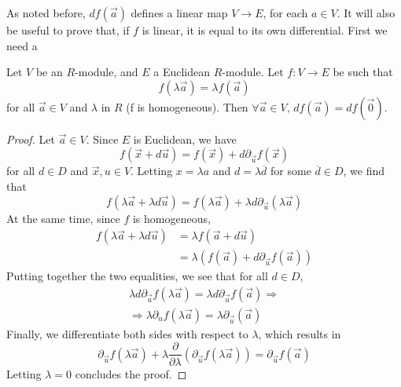 As noted before, \( df(\vec a) \) defines a linear map \( V\to E \), for each \( a\in V \). It will also be useful to prove that, if \( f \) is linear, it is equal to its own differential. First we need a

\begin{lemma}
  Let \( V \) be an \( R \)-module, and \( E \) a Euclidean \( R \)-module. Let \( f:V\to E \) be such that
  \begin{equation*}
    f(\lambda \vec a) = \lambda f(\vec a)
  \end{equation*}
  for all \( \vec a\in V \) and \( \lambda \) in \( R \) (f is homogeneous). Then \( \forall \vec a\in V,\, df(\vec a) = df(\vec 0) \).
  \label{lm:homg}
\end{lemma}

\begin{proof}
  Let \( \vec a\in V \). Since \( E \) is Euclidean, we have
  \begin{equation*}
    f(\vec x + d\vec u) = f(\vec x) + d\partial_{\vec u}f(\vec x)
  \end{equation*}
  for all \( d\in D \) and \( \vec x,u\in V \). Letting \( x=\lambda a \) and \( d = \lambda\overline d \) for some \( \overline d\in D \), we find that
  \begin{equation*}
    f(\lambda\vec a + \lambda d\vec u) = f(\lambda\vec a)+\lambda d\partial_{\vec u}(\lambda\vec a)
  \end{equation*}
  At the same time, since \( f \) is homogeneous,
  \begin{align*}
    f(\lambda\vec a + \lambda d\vec u) &= \lambda f(\vec a + d\vec u) \\
                                       &= \lambda (f(\vec a) + d\partial_{\vec u}f(\vec a))
  \end{align*}
  Putting together the two equalities, we see that for all \( d\in D \),
  \begin{align*}
    \lambda d\partial_{\vec u}f(\lambda\vec a) = \lambda d\partial_{\vec u}f(\vec a) \Rightarrow \\
    \Rightarrow \lambda\partial_{u}f(\lambda\vec a) = \lambda\partial_{\vec u}(\vec a)
  \end{align*}
  Finally, we differentiate both sides with respect to \( \lambda \), which results in
  \begin{equation*}
    \partial_{\vec u}f(\lambda\vec a) + \lambda\frac{\partial}{\partial\lambda}(\partial_{\vec u}f(\lambda\vec a)) = \partial_{\vec u}f(\vec a)
  \end{equation*}
  Letting \( \lambda=0 \) concludes the proof.
\end{proof}

